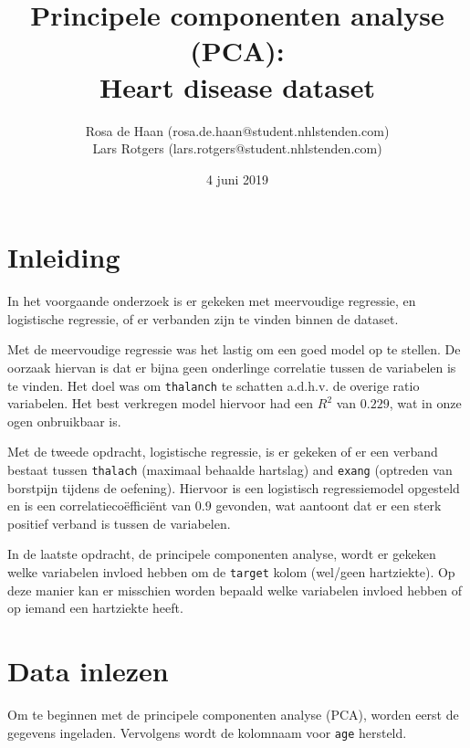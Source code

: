 \documentclass[11pt]{article}
\title{Principele componenten analyse (PCA): \\ Heart disease dataset}
\author{Rosa de Haan (rosa.de.haan@student.nhlstenden.com)\\ Lars Rotgers (lars.rotgers@student.nhlstenden.com)}
\date{4 juni 2019}
\begin{document}
    
    
    \maketitle
    \newpage
    \tableofcontents
    \newpage
    

    
    \hypertarget{inleiding}{%
\section{Inleiding}\label{inleiding}}

    In het voorgaande onderzoek is er gekeken met meervoudige regressie, en
logistische regressie, of er verbanden zijn te vinden binnen de dataset.

Met de meervoudige regressie was het lastig om een goed model op te
stellen. De oorzaak hiervan is dat er bijna geen onderlinge correlatie
tussen de variabelen is te vinden. Het doel was om \texttt{thalanch} te
schatten a.d.h.v. de overige ratio variabelen. Het best verkregen model
hiervoor had een \(R^2\) van \(0.229\), wat in onze ogen onbruikbaar is.

Met de tweede opdracht, logistische regressie, is er gekeken of er een
verband bestaat tussen \texttt{thalach} (maximaal behaalde hartslag) and
\texttt{exang} (optreden van borstpijn tijdens de oefening). Hiervoor is
een logistisch regressiemodel opgesteld en is een correlatiecoëfficiënt
van \(0.9\) gevonden, wat aantoont dat er een sterk positief verband is
tussen de variabelen.

In de laatste opdracht, de principele componenten analyse, wordt er
gekeken welke variabelen invloed hebben om de \texttt{target} kolom
(wel/geen hartziekte). Op deze manier kan er misschien worden bepaald
welke variabelen invloed hebben of op iemand een hartziekte heeft.

    \hypertarget{data-inlezen}{%
\section{Data inlezen}\label{data-inlezen}}

    Om te beginnen met de principele componenten analyse (PCA), worden eerst
de gegevens ingeladen. Vervolgens wordt de kolomnaam voor \texttt{age}
hersteld.
\end{document}
